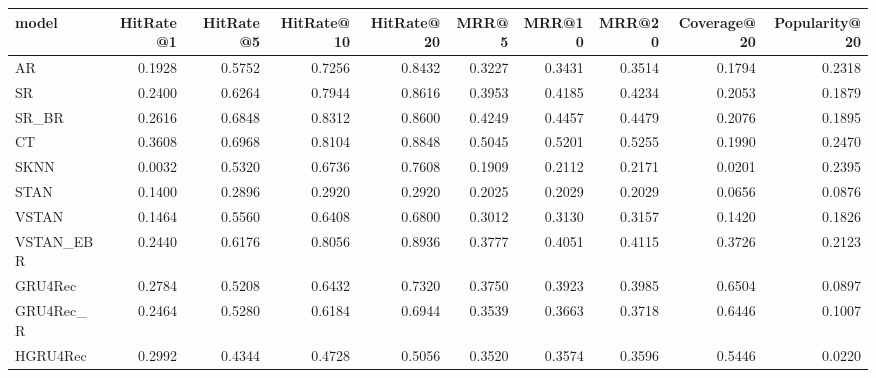 \begin{tabular}{lrrrrrrrrr}
\toprule
     model &  HitRate@1 &  HitRate@5 &  HitRate@10 &  HitRate@20 &   MRR@5 &  MRR@10 &  MRR@20 &  Coverage@20 &  Popularity@20 \\
\midrule
        AR &     0.1928 &     0.5752 &      0.7256 &      0.8432 &  0.3227 &  0.3431 &  0.3514 &       0.1794 &         0.2318 \\
        SR &     0.2400 &     0.6264 &      0.7944 &      0.8616 &  0.3953 &  0.4185 &  0.4234 &       0.2053 &         0.1879 \\
     SR\_BR &     0.2616 &     0.6848 &      0.8312 &      0.8600 &  0.4249 &  0.4457 &  0.4479 &       0.2076 &         0.1895 \\
        CT &     0.3608 &     0.6968 &      0.8104 &      0.8848 &  0.5045 &  0.5201 &  0.5255 &       0.1990 &         0.2470 \\
      SKNN &     0.0032 &     0.5320 &      0.6736 &      0.7608 &  0.1909 &  0.2112 &  0.2171 &       0.0201 &         0.2395 \\
      STAN &     0.1400 &     0.2896 &      0.2920 &      0.2920 &  0.2025 &  0.2029 &  0.2029 &       0.0656 &         0.0876 \\
     VSTAN &     0.1464 &     0.5560 &      0.6408 &      0.6800 &  0.3012 &  0.3130 &  0.3157 &       0.1420 &         0.1826 \\
 VSTAN\_EBR &     0.2440 &     0.6176 &      0.8056 &      0.8936 &  0.3777 &  0.4051 &  0.4115 &       0.3726 &         0.2123 \\
   GRU4Rec &     0.2784 &     0.5208 &      0.6432 &      0.7320 &  0.3750 &  0.3923 &  0.3985 &       0.6504 &         0.0897 \\
 GRU4Rec\_R &     0.2464 &     0.5280 &      0.6184 &      0.6944 &  0.3539 &  0.3663 &  0.3718 &       0.6446 &         0.1007 \\
  HGRU4Rec &     0.2992 &     0.4344 &      0.4728 &      0.5056 &  0.3520 &  0.3574 &  0.3596 &       0.5446 &         0.0220 \\
\bottomrule
\end{tabular}
